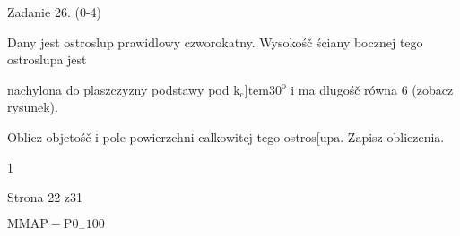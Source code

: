 \documentclass[a4paper,12pt]{article}
\begin{document}
Zadanie 26. (0-4)

Dany jest ostroslup prawidlowy czworokatny. Wysokośč ściany bocznej tego ostroslupa jest

nachylona do plaszczyzny podstawy pod $\mathrm{k}_{\mathrm{c}}$]$\mathrm{t}\mathrm{e}\mathrm{m} 30^{\mathrm{o}}$ i ma dlugośč równa 6 (zobacz rysunek).

Oblicz objetośč i pole powierzchni calkowitej tego ostros[upa. Zapisz obliczenia.

1

Strona 22 z31

$\mathrm{M}\mathrm{M}\mathrm{A}\mathrm{P}-\mathrm{P}0_{-}100$
\end{document}
